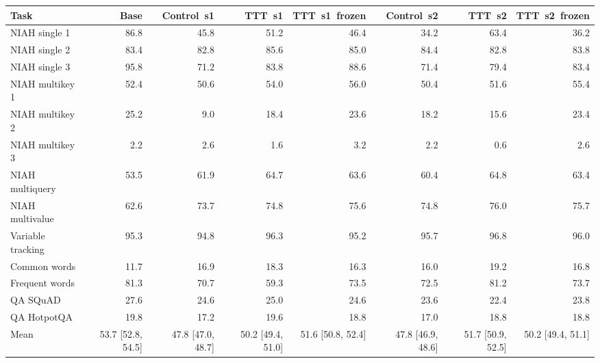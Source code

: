 \begin{tabular}{lrrrrrrr}
\toprule
Task & Base & Control~s1 & TTT~s1 & TTT~s1~frozen & Control~s2 & TTT~s2 & TTT~s2~frozen \\
\midrule
NIAH single 1 & 86.8 & 45.8 & 51.2 & 46.4 & 34.2 & 63.4 & 36.2 \\
NIAH single 2 & 83.4 & 82.8 & 85.6 & 85.0 & 84.4 & 82.8 & 83.8 \\
NIAH single 3 & 95.8 & 71.2 & 83.8 & 88.6 & 71.4 & 79.4 & 83.4 \\
NIAH multikey 1 & 52.4 & 50.6 & 54.0 & 56.0 & 50.4 & 51.6 & 55.4 \\
NIAH multikey 2 & 25.2 & 9.0 & 18.4 & 23.6 & 18.2 & 15.6 & 23.4 \\
NIAH multikey 3 & 2.2 & 2.6 & 1.6 & 3.2 & 2.2 & 0.6 & 2.6 \\
NIAH multiquery & 53.5 & 61.9 & 64.7 & 63.6 & 60.4 & 64.8 & 63.4 \\
NIAH multivalue & 62.6 & 73.7 & 74.8 & 75.6 & 74.8 & 76.0 & 75.7 \\
Variable tracking & 95.3 & 94.8 & 96.3 & 95.2 & 95.7 & 96.8 & 96.0 \\
Common words & 11.7 & 16.9 & 18.3 & 16.3 & 16.0 & 19.2 & 16.8 \\
Frequent words & 81.3 & 70.7 & 59.3 & 73.5 & 72.5 & 81.2 & 73.7 \\
QA SQuAD & 27.6 & 24.6 & 25.0 & 24.6 & 23.6 & 22.4 & 23.8 \\
QA HotpotQA & 19.8 & 17.2 & 19.6 & 18.8 & 17.0 & 18.8 & 18.8 \\
\midrule
Mean & 53.7 [52.8, 54.5] & 47.8 [47.0, 48.7] & 50.2 [49.4, 51.0] & 51.6 [50.8, 52.4] & 47.8 [46.9, 48.6] & 51.7 [50.9, 52.5] & 50.2 [49.4, 51.1] \\
\bottomrule
\end{tabular}
